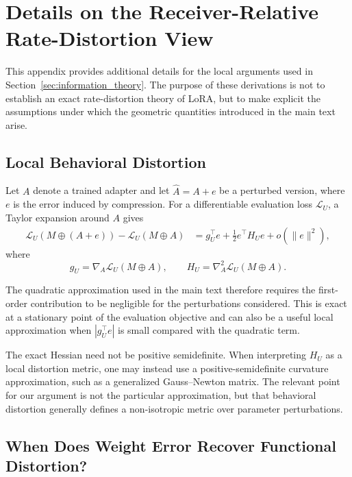 \section{Details on the Receiver-Relative Rate-Distortion View}
\label{app:rate-distortion}

This appendix provides additional details for the local arguments used in
Section~\ref{sec:information_theory}.
The purpose of these derivations is not to establish an exact rate-distortion
theory of LoRA, but to make explicit the assumptions under which the geometric
quantities introduced in the main text arise.

\subsection{Local Behavioral Distortion}
\label{app:local-distortion}

Let $A$ denote a trained adapter and let $\hat A=A+e$ be a perturbed version,
where $e$ is the error induced by compression.
For a differentiable evaluation loss $\mathcal{L}_U$, a Taylor expansion around
$A$ gives
\begin{equation}
\begin{split}
    \mathcal{L}_U(M\oplus(A+e))
    -
    \mathcal{L}_U(M\oplus A)
    &=
    g_U^\top e
    +
    \frac{1}{2}e^\top H_Ue
    +
    o(\|e\|^2),
\end{split}
\label{eq:app-taylor}
\end{equation}
where
\[
    g_U
    =
    \nabla_A \mathcal{L}_U(M\oplus A),
    \qquad
    H_U
    =
    \nabla_A^2 \mathcal{L}_U(M\oplus A).
\]

The quadratic approximation used in the main text therefore requires the
first-order contribution to be negligible for the perturbations considered.
This is exact at a stationary point of the evaluation objective and can also
be a useful local approximation when $|g_U^\top e|$ is small compared with the
quadratic term.

The exact Hessian need not be positive semidefinite.
When interpreting $H_U$ as a local distortion metric, one may instead use a
positive-semidefinite curvature approximation, such as a generalized
Gauss--Newton matrix.
The relevant point for our argument is not the particular approximation, but
that behavioral distortion generally defines a non-isotropic metric over
parameter perturbations.

\subsection{When Does Weight Error Recover Functional Distortion?}
\label{app:isotropy}

